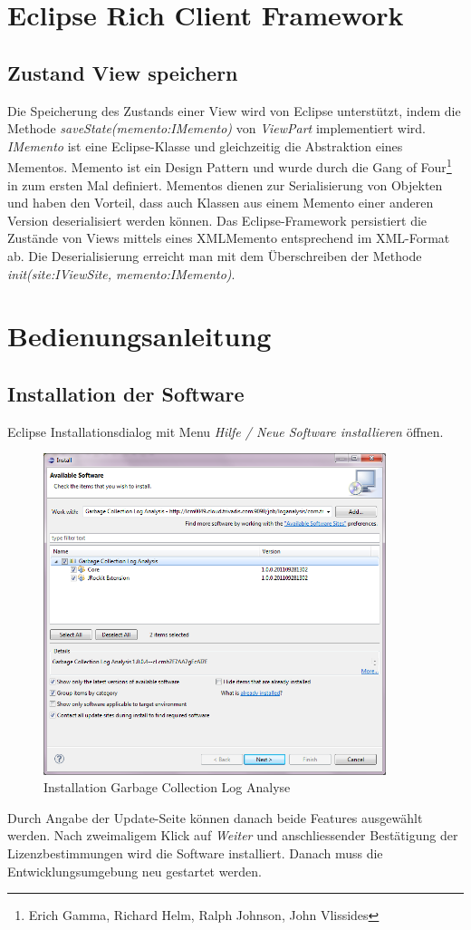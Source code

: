 \chapter{Eclipse Rich Client Framework}
\section*{Zustand View speichern}\label{memento}
Die Speicherung des Zustands einer View wird von Eclipse unterstützt, indem die Methode \textit{saveState(memento:IMemento)} von \textit{ViewPart} implementiert wird. \textit{IMemento} ist eine Eclipse-Klasse und gleichzeitig die Abstraktion eines Mementos. Memento ist ein Design Pattern und wurde durch die Gang of Four\footnote{Erich Gamma, Richard Helm, Ralph Johnson, John Vlissides} in \cite[S. 283]{gamma1995design} zum ersten Mal definiert. Mementos dienen zur Serialisierung von Objekten und haben den Vorteil, dass auch Klassen aus einem Memento einer anderen Version deserialisiert werden können. Das Eclipse-Framework persistiert die Zustände von Views mittels eines XMLMemento entsprechend im XML-Format ab. Die Deserialisierung erreicht man mit dem Überschreiben der Methode \textit{init(site:IViewSite, memento:IMemento)}.

\chapter{Bedienungsanleitung}\label{bedienungsanleitung}
\section*{Installation der Software}
Eclipse Installationsdialog mit Menu \textit{Hilfe / Neue Software installieren} öffnen.
 \begin{figure}[H]
  	\centering
    	\includegraphics[width=10cm]{images/tutorial_install01}
        	\caption{Installation Garbage Collection Log Analyse}
\end{figure}
Durch Angabe der Update-Seite können danach beide Features ausgewählt werden. Nach zweimaligem Klick auf \textit{Weiter} und anschliessender Bestätigung der Lizenzbestimmungen wird die Software installiert. Danach muss die Entwicklungsumgebung neu gestartet werden.


